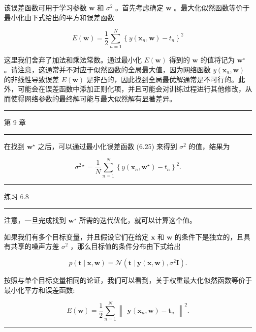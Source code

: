 \documentclass[10pt]{report}
\newcommand{\HRule}{\begin{center}\rule{0.9\linewidth}{0.2mm}\end{center}}
\begin{document}
该误差函数可用于学习参数 \(\mathbf{w}\) 和 \({\sigma }^{2}\) 。首先考虑确定 \(\mathbf{w}\) 。最大化似然函数等价于最小化由下式给出的平方和误差函数

\[
E\left( \mathbf{w}\right)  = \frac{1}{2}\mathop{\sum }\limits_{{n = 1}}^{N}{\left\{  y\left( {\mathbf{x}}_{n},\mathbf{w}\right)  - {t}_{n}\right\}  }^{2} \tag{6.26}
\]

这里我们舍弃了加法和乘法常数。通过最小化 \(E\left( \mathbf{w}\right)\) 得到的 \(\mathbf{w}\) 的值将记为 \({\mathbf{w}}^{ \star  }\) 。请注意，这通常并不对应于似然函数的全局最大值，因为网络函数 \(y\left( {{\mathbf{x}}_{n},\mathbf{w}}\right)\) 的非线性导致误差 \(E\left( \mathbf{w}\right)\) 是非凸的，因此找到全局最优解通常是不可行的。此外，可能会在误差函数中添加正则化项，并且可能会对训练过程进行其他修改，从而使得网络参数的最终解可能与最大似然解有显著差异。

\HRule

第 9 章

\HRule

在找到 \({\mathbf{w}}^{ \star  }\) 之后，可以通过最小化误差函数 (6.25) 来得到 \({\sigma }^{2}\) 的值，结果为

\[
{\sigma }^{2 \star  } = \frac{1}{N}\mathop{\sum }\limits_{{n = 1}}^{N}{\left\{  y\left( {\mathbf{x}}_{n},{\mathbf{w}}^{ \star  }\right)  - {t}_{n}\right\}  }^{2}. \tag{6.27}
\]

\HRule

练习 6.8

\HRule

注意，一旦完成找到 \({\mathbf{w}}^{ \star  }\) 所需的迭代优化，就可以计算这个值。

如果我们有多个目标变量，并且假设它们在给定 \(\mathbf{x}\) 和 \(\mathbf{w}\) 的条件下是独立的，且具有共享的噪声方差 \({\sigma }^{2}\) ，那么目标值的条件分布由下式给出

\[
p\left( {\mathbf{t} \mid  \mathbf{x},\mathbf{w}}\right)  = \mathcal{N}\left( {\mathbf{t} \mid  \mathbf{y}\left( {\mathbf{x},\mathbf{w}}\right) ,{\sigma }^{2}\mathbf{I}}\right) . \tag{6.28}
\]

按照与单个目标变量相同的论证，我们可以看到，关于权重最大化似然函数等价于最小化平方和误差函数:

\[
E\left( \mathbf{w}\right)  = \frac{1}{2}\mathop{\sum }\limits_{{n = 1}}^{N}{\begin{Vmatrix}\mathbf{y}\left( {\mathbf{x}}_{n},\mathbf{w}\right)  - {\mathbf{t}}_{n}\end{Vmatrix}}^{2}. \tag{6.29}
\]

\HRule
\end{document}
